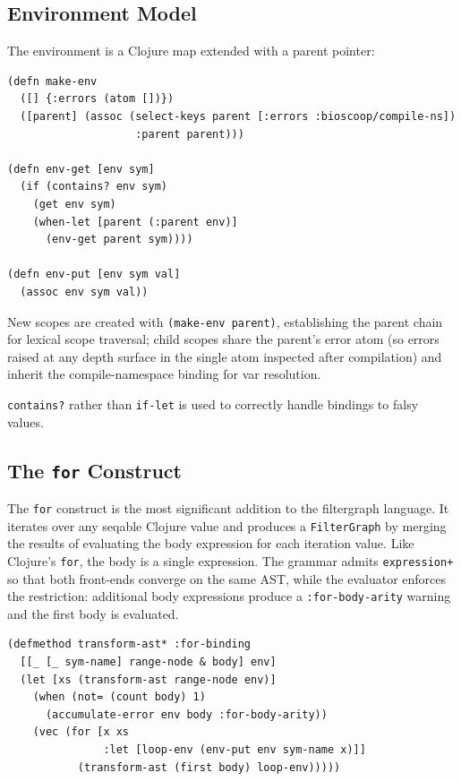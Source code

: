 \documentclass[english,submission]{programming}
\begin{document}
\subsection{Environment Model}

The environment is a Clojure map extended with a parent pointer:

\begin{lstlisting}[caption={Environment operations}]
(defn make-env
  ([] {:errors (atom [])})
  ([parent] (assoc (select-keys parent [:errors :bioscoop/compile-ns])
                    :parent parent)))

(defn env-get [env sym]
  (if (contains? env sym)
    (get env sym)
    (when-let [parent (:parent env)]
      (env-get parent sym))))

(defn env-put [env sym val]
  (assoc env sym val))
\end{lstlisting}

New scopes are created with \texttt{(make-env parent)}, establishing the parent chain for lexical scope traversal; child scopes share the parent's error atom (so errors raised at any depth surface in the single atom inspected after compilation) and inherit the compile-namespace binding for var resolution.

\texttt{contains?} rather than \texttt{if-let} is used to correctly handle bindings to falsy values.

\subsection{The \texttt{for} Construct}

The \texttt{for} construct is the most significant addition to the filtergraph language. It iterates over any seqable Clojure value and produces a \texttt{FilterGraph} by merging the results of evaluating the body expression for each iteration value. Like Clojure's \texttt{for}, the body is a single expression. The grammar admits \texttt{expression+} so that both front-ends converge on the same AST, while the evaluator enforces the restriction: additional body expressions produce a \texttt{:for-body-arity} warning and the first body is evaluated.

\begin{lstlisting}[caption={for-binding evaluation}]
(defmethod transform-ast* :for-binding
  [[_ [_ sym-name] range-node & body] env]
  (let [xs (transform-ast range-node env)]
    (when (not= (count body) 1)
      (accumulate-error env body :for-body-arity))
    (vec (for [x xs
               :let [loop-env (env-put env sym-name x)]]
           (transform-ast (first body) loop-env)))))
\end{lstlisting}
\end{document}
